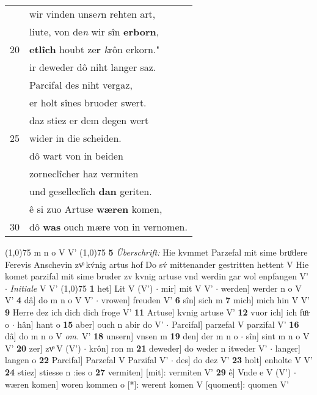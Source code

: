 \documentclass[8pt,a4paper,notitlepage]{article}
\begin{document}
\begin{table}[ht]
\begin{minipage}[t]{0.5\linewidth}
\begin{tabular}{rl}
 & wir vinden unse\textit{r}n rehten art,\\ 
 & liute, von de\textit{n} wir sîn \textbf{erborn},\\ 
20 & \textbf{etlîch} houbt ze\textbf{r} \textit{k}rôn erkorn."\\ 
 & ir deweder dô niht langer saz.\\ 
 & Parcifal des niht vergaz,\\ 
 & er holt sînes bruoder swert.\\ 
 & daz stiez er dem degen wert\\ 
25 & wider in die scheiden.\\ 
 & dô wart von in beiden\\ 
 & zorneclîcher haz vermiten\\ 
 & und geselleclîch \textbf{dan} geriten.\\ 
 & ê si zuo Artuse \textbf{wæren} komen,\\ 
30 & dô \textbf{was} ouch mære von in vernomen.\\ 
\end{tabular}
\scriptsize
\line(1,0){75} \newline
m n o V V' \newline
\line(1,0){75} \newline
\textbf{5} \textit{Überschrift:} Hie kvmmet Parzefal mit sime bruͦdere Ferevis Anschevin zvͦ kv́nig artus hof Do sv́ mittenander gestritten hettent V  Hie komet parzifal mit sime bruder zv kvnig artuse vnd werdin gar wol enpfangen V'   $\cdot$ \textit{Initiale} V V'  \newline
\line(1,0){75} \newline
\textbf{1} het] Lit V (V')  $\cdot$ mir] mit V V'  $\cdot$ werden] werder n o V V' \textbf{4} dâ] do m n o V V'  $\cdot$ vrowen] freuden V' \textbf{6} sîn] sich m \textbf{7} mich] mich hin V V' \textbf{9} Herre dez ich dich dich froge V' \textbf{11} Artuse] kvnig artuse V' \textbf{12} vuor ich] ich fuͦr o  $\cdot$ hân] hant o \textbf{15} aber] ouch n abir do V'  $\cdot$ Parcifal] parzefal V parzifal V' \textbf{16} dâ] do m n o V \textit{om.} V' \textbf{18} unsern] vnsen m \textbf{19} den] der m n o  $\cdot$ sîn] sint m n o V V' \textbf{20} zer] zvͦ V (V')  $\cdot$ krôn] ron m \textbf{21} deweder] do weder n itweder V'  $\cdot$ langer] langen o \textbf{22} Parcifal] Parzefal V Parzifal V'  $\cdot$ des] do dez V' \textbf{23} holt] enholte V V' \textbf{24} stiez] stiesse n :ies o \textbf{27} vermiten] [mit]: vermiten V' \textbf{29} ê] Vnde e V (V')  $\cdot$ wæren komen] woren kommen o [*]: werent komen V [quoment]: quomen V' \newline
\end{minipage}
\end{table}
\end{document}
